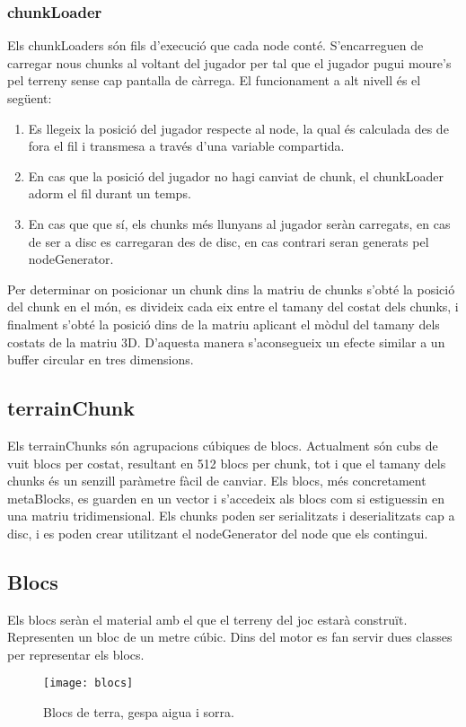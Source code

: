 \subsubsection{chunkLoader}
Els chunkLoaders són fils d'execució que cada node conté. S'encarreguen de carregar nous chunks al voltant del jugador per tal que el jugador pugui moure's pel terreny sense cap pantalla de càrrega.
El funcionament a alt nivell és el següent:
\begin{enumerate}
  \item Es llegeix la posició del jugador respecte al node, la qual és calculada des de fora el fil i transmesa a través d'una variable compartida.
  \item En cas que la posició del jugador no hagi canviat de chunk, el chunkLoader adorm el fil durant un temps.
  \item En cas que que sí, els chunks més llunyans al jugador seràn carregats, en cas de ser a disc es carregaran des de disc, en cas contrari seran generats pel nodeGenerator.
\end{enumerate}
Per determinar on posicionar un chunk dins la matriu de chunks s'obté la posició del chunk en el món, es divideix cada eix entre el tamany del costat dels chunks, i finalment s'obté la posició dins de la matriu aplicant el mòdul del tamany dels costats de la matriu 3D.
D'aquesta manera s'aconsegueix un efecte similar a un buffer circular en tres dimensions.

\subsection{terrainChunk}
Els terrainChunks són agrupacions cúbiques de blocs. Actualment són cubs de vuit blocs per costat, resultant en 512 blocs per chunk, tot i que el tamany dels chunks és un senzill paràmetre fàcil de canviar.
Els blocs, més concretament metaBlocks, es guarden en un vector i s'accedeix als blocs com si estiguessin en una matriu tridimensional.
Els chunks poden ser serialitzats i deserialitzats cap a disc, i es poden crear utilitzant el nodeGenerator del node que els contingui.
\subsection{Blocs}
Els blocs seràn el material amb el que el terreny del joc estarà construït. Representen un bloc de un metre cúbic. Dins del motor es fan servir dues classes per representar els blocs.
\begin{figure}[H]
\centering
\texttt{[image: blocs]}
\caption{Blocs de terra, gespa aigua i sorra.}
\end{figure}

